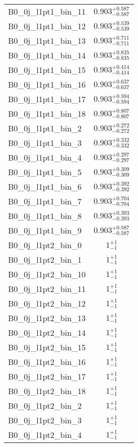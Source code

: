 \begin{tabular}{|l|c|}
B0\_0j\_l1pt1\_bin\_11 & $0.903^{+0.587}_{-0.587}$ \\
B0\_0j\_l1pt1\_bin\_12 & $0.903^{+0.539}_{-0.539}$ \\
B0\_0j\_l1pt1\_bin\_13 & $0.903^{+0.711}_{-0.711}$ \\
B0\_0j\_l1pt1\_bin\_14 & $0.903^{+0.835}_{-0.835}$ \\
B0\_0j\_l1pt1\_bin\_15 & $0.903^{+0.414}_{-0.414}$ \\
B0\_0j\_l1pt1\_bin\_16 & $0.903^{+0.637}_{-0.637}$ \\
B0\_0j\_l1pt1\_bin\_17 & $0.903^{+0.594}_{-0.594}$ \\
B0\_0j\_l1pt1\_bin\_18 & $0.903^{+0.807}_{-0.807}$ \\
B0\_0j\_l1pt1\_bin\_2 & $0.903^{+0.272}_{-0.272}$ \\
B0\_0j\_l1pt1\_bin\_3 & $0.903^{+0.332}_{-0.332}$ \\
B0\_0j\_l1pt1\_bin\_4 & $0.903^{+0.297}_{-0.297}$ \\
B0\_0j\_l1pt1\_bin\_5 & $0.903^{+0.309}_{-0.309}$ \\
B0\_0j\_l1pt1\_bin\_6 & $0.903^{+0.392}_{-0.392}$ \\
B0\_0j\_l1pt1\_bin\_7 & $0.903^{+0.704}_{-0.704}$ \\
B0\_0j\_l1pt1\_bin\_8 & $0.903^{+0.393}_{-0.393}$ \\
B0\_0j\_l1pt1\_bin\_9 & $0.903^{+0.587}_{-0.587}$ \\
B0\_0j\_l1pt2\_bin\_0 & $1^{+1}_{-1}$ \\
B0\_0j\_l1pt2\_bin\_1 & $1^{+1}_{-1}$ \\
B0\_0j\_l1pt2\_bin\_10 & $1^{+1}_{-1}$ \\
B0\_0j\_l1pt2\_bin\_11 & $1^{+1}_{-1}$ \\
B0\_0j\_l1pt2\_bin\_12 & $1^{+1}_{-1}$ \\
B0\_0j\_l1pt2\_bin\_13 & $1^{+1}_{-1}$ \\
B0\_0j\_l1pt2\_bin\_14 & $1^{+1}_{-1}$ \\
B0\_0j\_l1pt2\_bin\_15 & $1^{+1}_{-1}$ \\
B0\_0j\_l1pt2\_bin\_16 & $1^{+1}_{-1}$ \\
B0\_0j\_l1pt2\_bin\_17 & $1^{+1}_{-1}$ \\
B0\_0j\_l1pt2\_bin\_18 & $1^{+1}_{-1}$ \\
B0\_0j\_l1pt2\_bin\_2 & $1^{+1}_{-1}$ \\
B0\_0j\_l1pt2\_bin\_3 & $1^{+1}_{-1}$ \\
B0\_0j\_l1pt2\_bin\_4 & $1^{+1}_{-1}$ \\

\end{tabular}
